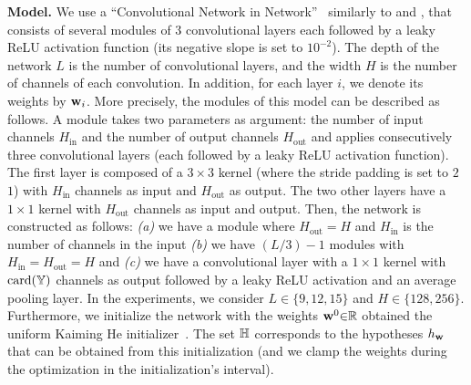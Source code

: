 \textbf{Model.} 
We use a ``Convolutional Network in Network''~\citep{LinChenYan2013} similarly to \citet{JiangNeyshaburMobahiKrishnanBengio2020} and \citet{DziugaiteDrouinNealRajkumarCaballeroWangMitliagkasRoy2020} , that consists of several modules of $3$ convolutional layers each followed by a leaky ReLU activation function (its negative slope is set to $10^{-2}$). The depth of the network $L$ is the number of convolutional layers, and the width $H$ is the number of channels of each convolution.
In addition, for each layer $i$, we denote its weights by $\mathbf{w}_{i}$.
More precisely, the modules of this model can be described as follows.
A module takes two parameters as argument: the number of input channels $H_{\text{in}}$ and the number of output channels $H_{\text{out}}$ and applies consecutively three convolutional layers (each followed by a leaky ReLU activation function).
The first layer is composed of a $3{\times}3$ kernel (where the stride \resp padding is set to $2$ \resp $1$) with $H_{\text{in}}$ channels as input and $H_{\text{out}}$ as output.
The two other layers have a $1{\times}1$ kernel with $H_{\text{out}}$ channels as input and output.
Then, the network is constructed as follows: {\it (a)} we have a module where $H_{\text{out}}=H$ and $H_{\text{in}}$ is the number of channels in the input {\it (b)} we have $(L/3)-1$ modules with $H_{\text{in}}=H_{\text{out}}=H$ and {\it (c)} we have a convolutional layer with a $1{\times}1$ kernel with $\operatorname{card}(\mathbb{Y})$ channels as output followed by a leaky ReLU activation and an average pooling layer.
In the experiments, we consider $L{\in}\{9, 12, 15\}$ and $H{\in}\{128, 256\}$.
Furthermore, we initialize the network with the weights $\mathbf{w}^{0}{\in}\mathbb{R}$ obtained the uniform Kaiming He initializer~\citep{HeZhangRenSun2015}.
The set $\mathbb{H}$ corresponds to the hypotheses $h_{\mathbf{w}}$ that can be obtained from this initialization (and we clamp the weights during the optimization in the initialization's interval).\\

